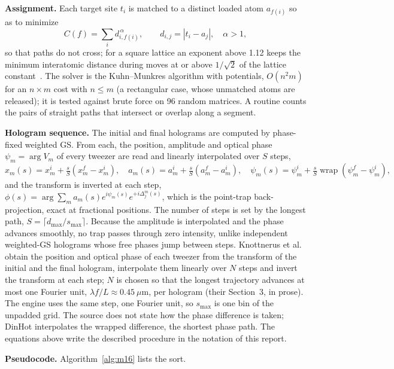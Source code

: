 \textbf{Assignment.} Each target site $t_i$ is matched to a distinct loaded atom $a_{f(i)}$ so as to minimize
\begin{equation}
C(f)=\sum_i d_{i,f(i)}^{\,\alpha},\qquad d_{i,j}=|t_i-a_j|,\quad\alpha>1,
\label{eq:m16}
\end{equation}
so that paths do not cross; for a square lattice an exponent above 1.12 keeps the minimum interatomic distance during moves at or above $1/\sqrt2$ of the lattice constant~\cite{lee2017}. The solver is the Kuhn--Munkres algorithm with potentials, $O(n^2m)$ for an $n\times m$ cost with $n\le m$ (a rectangular case, whose unmatched atoms are released); it is tested against brute force on 96 random matrices. A routine counts the pairs of straight paths that intersect or overlap along a segment.

\textbf{Hologram sequence.} The initial and final holograms are computed by phase-fixed weighted GS. From each, the position, amplitude and optical phase $\psi_m=\arg V_m$ of every tweezer are read and linearly interpolated over $S$ steps,
\begin{equation}
x_m(s)=x_m^{i}+\tfrac sS(x_m^{f}-x_m^{i}),\quad a_m(s)=a_m^{i}+\tfrac sS(a_m^{f}-a_m^{i}),\quad
\psi_m(s)=\psi_m^{i}+\tfrac sS\operatorname{wrap}(\psi_m^{f}-\psi_m^{i}),
\label{eq:m16-lpi}
\end{equation}
and the transform is inverted at each step, $\phi(s)=\arg\sum_ma_m(s)e^{i\psi_m(s)}e^{+i\Delta_j^m(s)}$, which is the point-trap back-projection, exact at fractional positions. The number of steps is set by the longest path, $S=\lceil d_{\max}/s_{\max}\rceil$. Because the amplitude is interpolated and the phase advances smoothly, no trap passes through zero intensity, unlike independent weighted-GS holograms whose free phases jump between steps. Knottnerus et al.~\cite{lpi} obtain the position and optical phase of each tweezer from the transform of the initial and the final hologram, interpolate them linearly over $N$ steps and invert the transform at each step; $N$ is chosen so that the longest trajectory advances at most one Fourier unit, $\lambda f/L\approx0.45\ \mu\mathrm{m}$, per hologram (their Section~3, in prose). The engine uses the same step, one Fourier unit, so $s_{\max}$ is one bin of the unpadded grid. The source does not state how the phase difference is taken; DinHot interpolates the wrapped difference, the shortest phase path. The equations above write the described procedure in the notation of this report.

\textbf{Pseudocode.} Algorithm~\ref{alg:m16} lists the sort.

